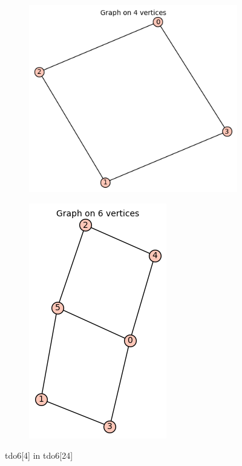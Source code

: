 \documentclass[12pt, a4paper]{article}
\begin{document}
\begin{center}
\begin{figure}[!htb]
\centering
\begin{subfigure}{0.5\textwidth}
  \centering
  \includegraphics[width=0.5\linewidth]{tdo6[4]}
\end{subfigure}%
\begin{subfigure}{0.5\textwidth}
  \centering
  \includegraphics[width=0.4\linewidth]{tdo6[24]}
\end{subfigure}
\caption{tdo6[4] in tdo6[24]}
\label{fig:test}
\end{figure}


\end{center}
\end{document}
